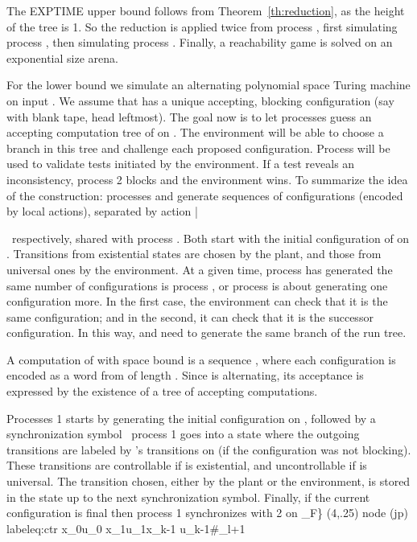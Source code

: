 \documentclass{llncs}
\renewenvironment{proof}{{\em Proof. }}{\nopagebreak
  \hspace*{\fill}}
\begin{document}
\begin{proof}
The EXPTIME upper bound follows from Theorem~\ref{th:reduction}, as
  the height of the tree is 1.
So the reduction is applied twice
from process , first simulating process , then simulating
process . Finally, a reachability game is solved on an exponential
size arena.  

  For the lower bound we simulate an alternating polynomial space
  Turing machine  on input . We assume that  has a unique
  accepting, blocking configuration (say with blank tape, head
  leftmost). The goal now is to let processes  guess an accepting
  computation tree of  on . The environment will be able to
  choose a branch in this tree and challenge each proposed
  configuration. Process  will be used to validate tests initiated
  by the environment. If a test reveals an inconsistency, process 2
  blocks and the environment wins. To summarize the idea of the construction: 
  processes  and 
  generate sequences of configurations (encoded by local actions),
  separated by action \bar{\, respectively, shared with
  process . Both start with the initial configuration of  on
  . Transitions from existential states are chosen by the plant,
  and those from universal ones by the environment. 
At a given time, process  has generated the same number of
configurations is process , or process  is about generating one
configuration more. In the first case, the environment can check
that it is the
same configuration; and in the second, it can check that it is the successor
configuration. In this way,  and  need to generate the same branch of the
run tree.

  A computation of  with space bound  is a sequence , where each configuration  is
  encoded as a word from  of length
  . Since  is alternating, its acceptance is expressed by the existence
  of a tree of accepting computations. 

  Processes 1 starts by generating the initial configuration on , followed by a synchronization
  symbol \ process 1 goes into a state where the outgoing
  transitions are labeled by 's transitions on  (if the
  configuration was not blocking). These transitions are controllable
  if  is existential, and uncontrollable if  is
  universal. The transition chosen, either by the plant or the
  environment, is  stored in the state up to the next synchronization symbol.  Finally, if the current
  configuration is final then process 1 synchronizes with 2 on _F\}
(4,.25) node (jp) {}\\label{eq:ctr}
  x_0u_0  x_1u_1\cdots  x_{k-1} u_{k-1}\#_{l+1}

}
\end{proof}
\end{document}
